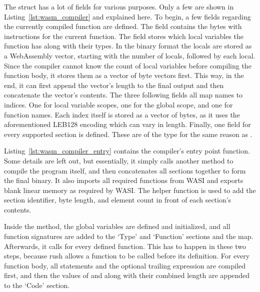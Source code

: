 The  struct has a lot of fields for various purposes.
Only a few are shown in Listing~\ref{lst:wasm_compiler} and explained here.
To begin, a few fields regarding the currently compiled function are defined.
The field  contains the bytes with instructions for the current function.
The field  stores which local variables the function has along with their types.
In the binary format the locals are stored as a WebAssembly vector, starting with the number of locals, followed by each local.
Since the compiler cannot know the count of local variables before compiling the function body, it stores them as a vector of byte vectors first.
This way, in the end, it can first append the vector's length to the final output and then concatenate the vector's contents.
The three following fields all map names to indices.
One for local variable scopes, one for the global scope, and one for function names.
Each index itself is stored as a vector of bytes, as it uses the aforementioned  LEB128 encoding which can vary in length.
Finally, one field for every supported section is defined.
These are of the type  for the same reason as .


Listing~\ref{lst:wasm_compiler_entry} contains the compiler's entry point function.
Some details are left out, but essentially, it simply calls another method to compile the program itself, and then concatenates all sections together to form the final binary.
It also imports all required functions from WASI and exports blank linear memory as required by WASI.
The  helper function is used to add the section identifier, byte length, and element count in front of each section's contents.


Inside the  method, the global variables are defined and initialized, and all function signatures are added to the `Type' and `Function' sections and the  map.
Afterwards, it calls  for every defined function.
This has to happen in these two steps, because rush allows a function to be called before its definition.
For every function body, all statements and the optional trailing expression are compiled first, and then the values of  and  along with their combined length are appended to the `Code' section.

